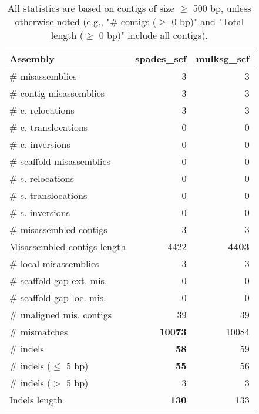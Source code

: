 \documentclass[12pt,a4paper]{article}
\begin{document}
\begin{table}[ht]
\begin{center}
\caption{All statistics are based on contigs of size $\geq$ 500 bp, unless otherwise noted (e.g., "\# contigs ($\geq$ 0 bp)" and "Total length ($\geq$ 0 bp)" include all contigs).}
\begin{tabular}{|l*{2}{|r}|}
\hline
Assembly & spades\_scf & mulksg\_scf \\ \hline
\# misassemblies & 3 & 3 \\ \hline
\hspace{2mm}\# contig misassemblies & 3 & 3 \\ \hline
\hspace{5mm}\# c. relocations & 3 & 3 \\ \hline
\hspace{5mm}\# c. translocations & 0 & 0 \\ \hline
\hspace{5mm}\# c. inversions & 0 & 0 \\ \hline
\hspace{2mm}\# scaffold misassemblies & 0 & 0 \\ \hline
\hspace{5mm}\# s. relocations & 0 & 0 \\ \hline
\hspace{5mm}\# s. translocations & 0 & 0 \\ \hline
\hspace{5mm}\# s. inversions & 0 & 0 \\ \hline
\# misassembled contigs & 3 & 3 \\ \hline
Misassembled contigs length & 4422 & {\bf 4403} \\ \hline
\# local misassemblies & 3 & 3 \\ \hline
\# scaffold gap ext. mis. & 0 & 0 \\ \hline
\# scaffold gap loc. mis. & 0 & 0 \\ \hline
\# unaligned mis. contigs & 39 & 39 \\ \hline
\# mismatches & {\bf 10073} & 10084 \\ \hline
\# indels & {\bf 58} & 59 \\ \hline
\hspace{5mm}\# indels ($\leq$ 5 bp) & {\bf 55} & 56 \\ \hline
\hspace{5mm}\# indels ($>$ 5 bp) & 3 & 3 \\ \hline
Indels length & {\bf 130} & 133 \\ \hline
\end{tabular}
\end{center}
\end{table}
\end{document}
